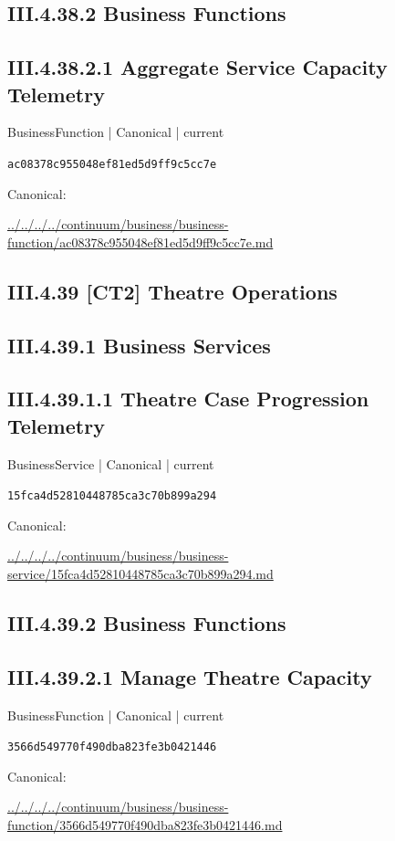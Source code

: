 \documentclass[10pt,a4paper]{article}
\begin{document}
\subsection*{III.4.38.2 Business Functions}
\subsection*{III.4.38.2.1 Aggregate Service Capacity Telemetry}
{\small BusinessFunction | Canonical | current}\par
\texttt{ac08378c955048ef81ed5d9ff9c5cc7e}\par
Canonical: \par
{\footnotesize\url{../../../../continuum/business/business-function/ac08378c955048ef81ed5d9ff9c5cc7e.md}}\par
\subsection*{III.4.39 [CT2] Theatre Operations}
\subsection*{III.4.39.1 Business Services}
\subsection*{III.4.39.1.1 Theatre Case Progression Telemetry}
{\small BusinessService | Canonical | current}\par
\texttt{15fca4d52810448785ca3c70b899a294}\par
Canonical: \par
{\footnotesize\url{../../../../continuum/business/business-service/15fca4d52810448785ca3c70b899a294.md}}\par
\subsection*{III.4.39.2 Business Functions}
\subsection*{III.4.39.2.1 Manage Theatre Capacity}
{\small BusinessFunction | Canonical | current}\par
\texttt{3566d549770f490dba823fe3b0421446}\par
Canonical: \par
{\footnotesize\url{../../../../continuum/business/business-function/3566d549770f490dba823fe3b0421446.md}}\par
\end{document}

